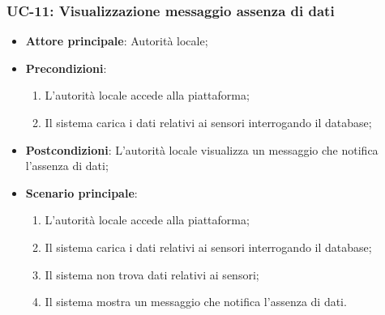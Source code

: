 \subsubsection{UC-11: Visualizzazione messaggio assenza di dati}
\begin{itemize}
	\item \textbf{Attore principale}: Autorità locale;
	\item \textbf{Precondizioni}:
	      \begin{enumerate}
		      \item L'autorità locale accede alla piattaforma;
		      \item Il sistema carica i dati relativi ai sensori interrogando il database;
	      \end{enumerate}
	\item \textbf{Postcondizioni}: L'autorità locale visualizza un messaggio che notifica l'assenza di dati;
	\item \textbf{Scenario principale}:
	      \begin{enumerate}
		      \item L'autorità locale accede alla piattaforma;
		      \item Il sistema carica i dati relativi ai sensori interrogando il database;
		      \item Il sistema non trova dati relativi ai sensori;
		      \item Il sistema mostra un messaggio che notifica l'assenza di dati.
	      \end{enumerate}
\end{itemize}

